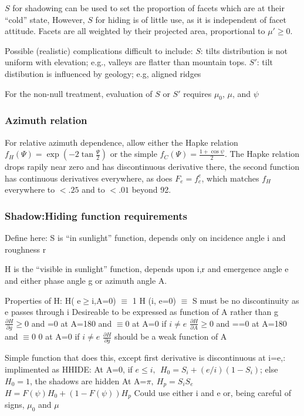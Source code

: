 \documentclass{article}
\begin{document}
$S$ for shadowing can be used to set the proportion of facets which are at their
``cold'' state, However, $S$ for hiding is of little use, as it is independent
of facet attitude. Facets are all weighted by their projected area, proportional
to $\mu' \geq 0 $.

Possible (realistic) complications difficult to include:
\qi $S$: tilts distribution is not uniform with elevation; e.g., valleys are flatter than mountain tops. 
\qi $S'$: tilt distibution is influenced by geology; e.g, aligned ridges

For the non-null treatment, evaluation of $S$ or $S'$ requires $\mu_0$, $\mu$,
and $\psi$

\subsubsection{Azimuth relation \label{azi} }  %

For relative azimuth dependence, allow either the Hapke relation $f_H(\Psi)=\exp
  \left( -2 \tan \frac{\Psi}{2} \right)$ or the simple  $f_C(\Psi)=\frac{1+ \cos \psi}{2}$. The Hapke relation drops rapily near zero and has discontinuous derivative there, the second function has continuous derivatives everywhere, as does $F_e=f_c^e$, which matches $f_H$ everywhere to $<.25$ and to $< .01$ beyond 92\qd.


\subsubsection{Shadow:Hiding function requirements}  %

 Define here: S is  ``in sunlight'' function, depends only on incidence angle i and roughness r

H is the ``visible in sunlight'' function, depends upon i,r and emergence angle e and either phase angle g or azimuth angle A. 

 Properties of H:
\qi H( e$\geq$i,A=0)  $\equiv $ 1
\qi H (i, e=0) $\equiv $ S
\qi must be no discontinuity as e passes through i
\qi Desireable to be expressed as function of A rather than  g
\qi $\frac{\partial H}{\partial g} \geq 0$ and =0 at A=180\qd
\qii and $\equiv 0$ at A=0 if $ i \neq e $
\qi $\frac{\partial H}{\partial A} \geq 0$ and ==0 at A=180\qd
\qii and $\equiv 0$ 0 at A=0 if $ i \neq e $
\qi $\frac{\partial H}{\partial g} $ should be a weak function of A

Simple function that does this, except first derivative is discontinuous at i=e,: implimented as HHIDE: 
\qi At A=0, if $e \leq i, \ \  H_0=S_i+(e/i)(1-S_i)$; else $H_0=1$, the shadows are hidden
\qi At A=$\pi, \ H_p=S_iS_e$
\\ $H=F(\psi)H_0 +  \left( 1-F(\psi) \right) H_p$
\qi Could use either i and e or, being careful of signs, $\mu_0$ and $\mu$
\end{document}
